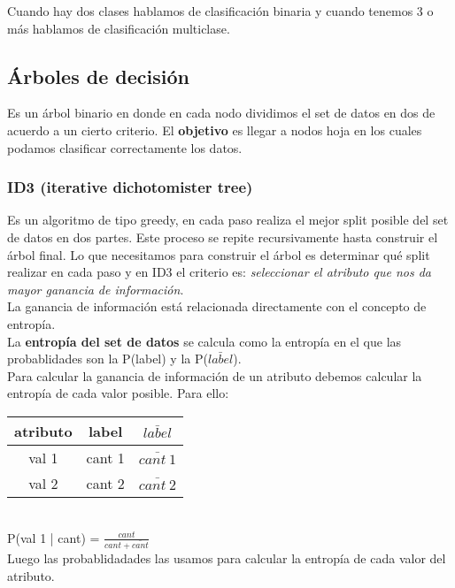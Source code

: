 \documentclass[titlepage,a4paper]{article}
\begin{document}
Cuando hay dos clases hablamos de clasificación binaria y cuando tenemos 3 o más hablamos de clasificación multiclase. 

\subsection*{Árboles de decisión}
Es un árbol binario en donde en cada nodo dividimos el set de datos en dos de acuerdo a un cierto criterio. El \textbf{objetivo} es llegar a nodos hoja en los cuales podamos clasificar correctamente los datos. 

\subsubsection*{ID3 (iterative dichotomister tree)}
Es un algoritmo de tipo greedy, en cada paso realiza el mejor split posible del set de datos en dos partes. Este proceso se repite recursivamente hasta construir el árbol final. Lo que necesitamos para construir el árbol es determinar qué split realizar en cada paso y en ID3 el criterio es: \textit{seleccionar el atributo que nos da mayor ganancia de información}.\\

La ganancia de información está relacionada directamente con el concepto de entropía. \\

La\textbf{ entropía del set de datos} se calcula como la entropía en el que las probablidades son la P(label) y la P($\bar{label}$).\\

Para calcular la ganancia de información de un atributo debemos calcular la entropía de cada valor posible. Para ello: \\

\begin{tabular}{|c|c|c|}
\hline
atributo & label & $\bar{label}$ \\ \hline
val 1 & cant 1 & $\bar{cant\ 1}$ \\ \hline
val 2 & cant 2 & $\bar{cant\ 2}$ \\ \hline
\end{tabular}
\\

P(val 1 | cant) = $\frac{cant}{cant +\bar{cant}}$\\

Luego las probablidadades las usamos para calcular la entropía de cada valor del atributo.\\
\end{document}
